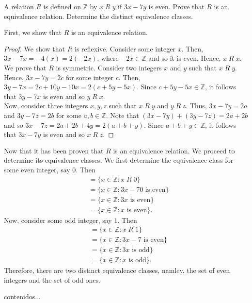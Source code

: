 \documentclass[12pt]{article}
\newcommand{\Z}{\mathbb{Z}}
\newenvironment{problem}[2][Problem]{\begin{trivlist}
		\item[\hskip \labelsep {\bfseries #1}\hskip \labelsep {\bfseries #2.}]}{\end{trivlist}}
\newenvironment{solution}[2][Solution]{\begin{trivlist}
		\item[\hskip \labelsep {\bfseries #1}\hskip \labelsep {\bfseries #2.}]}{\end{trivlist}}
\begin{document}
 	\begin{problem}{40}
 		A relation $R$ is defined on $\Z$ by $x\; R \;y$ if $3x-7y$ is even. Prove that $R$ is an equivalence relation. Determine the distinct equivalence classes.
 		\begin{solution}{40}
 			First, we show that $R$ is an equivalence relation.
 			\begin{proof}
 				We show that $R$ is reflexive. Consider some integer $x$. Then, $3x-7x = -4(x) = 2(-2x)$, where $-2x\in \Z$ and so it is even. Hence, $x\;R \;x$. \\
 				We prove that $R$ is symmetric. Consider two integers $x$ and $y$ such that $x\; R \; y$. Hence, $3x-7y = 2c$ for some integer $c$. Then, $3y-7x = 2c +10y-10x = 2(c+5y-5x)$. Since $c+5y-5x\in \Z$, it follows that $3y-7x$ is even and so $y\; R \;x$.\\
 				Now, consider three integers $x,y,z$ such that $x\; R \;y$ and $y\; R \; z$. Thus, $3x-7y = 2a$ and $3y-7z = 2b$ for some $a,b\in \Z$. Note that $(3x-7y) + (3y-7z) = 2a+2b$ and so $3x-7z = 2a+2b +4y = 2(a+b+y)$. Since $a+b+y\in \Z$, it follows that $3x-7y$ is even and so $x\; R \;z$.
 			\end{proof}
 		Now that it has been proven that $R$ is an equivalence relation. We proceed to determine its equivalence classes. We first determine the equivalence class for some even integer, say 0. Then
 		\begin{align*}
 			[0] &= \{x\in \Z:x\; R \; 0\}\\
 			&= \{x\in \Z: 3x-70 \text{ is even}\}\\
 			&= \{x\in \Z: 3x \text{ is even}\}\\
 			&= \{x\in \Z: x \text{ is even}\}.
 		\end{align*}
 	Now, consider some odd integer, say $1$. Then
 	\begin{align*}
 		[1] &= \{x\in \Z : x\; R \;1\}\\
 		&= \{x\in \Z : 3x-7 \text{ is even}\}\\
 		&= \{x\in \Z: 3x \text{ is odd}\}\\
 		&= \{x\in \Z: x \text{ is odd}\}.
 	\end{align*}
 Therefore, there are two distinct equivalence classes, namley, the set of even integers and the set of odd ones.
 		\end{solution} 
 	\end{problem} 
 
 	\begin{problem}{41}
 		contenidos...
 	\end{problem}
\end{document}
